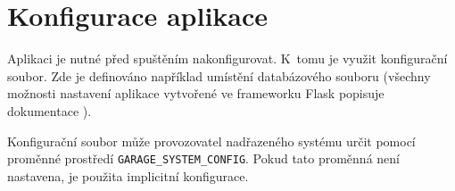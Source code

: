 \section{Konfigurace aplikace}
\label{sec:im_config}

Aplikaci je nutné před spuštěním nakonfigurovat. K~tomu je využit konfigurační soubor. Zde je definováno například umístění databázového souboru (všechny možnosti nastavení aplikace vytvořené ve frameworku Flask popisuje dokumentace \cite{flask_config}).

Konfigurační soubor může provozovatel nadřazeného systému určit pomocí proměnné prostředí \texttt{GARAGE\_SYSTEM\_CONFIG}. Pokud tato proměnná není nastavena, je použita implicitní konfigurace.